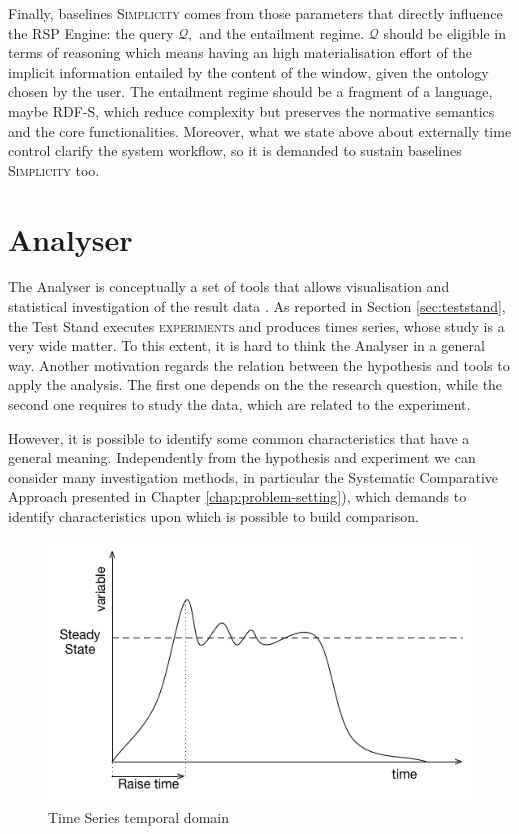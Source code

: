 Finally, baselines \textsc{Simplicity} comes from those parameters that directly influence the RSP Engine: the query $\mathcal{Q},$ and the entailment regime. $\mathcal{Q}$ should be eligible in terms of reasoning which means having an high materialisation effort of the implicit information entailed by the content of the window, given the ontology chosen by the user. The entailment regime should be a fragment of a language, maybe RDF-S,  which reduce complexity but preserves the normative semantics and the core functionalities. Moreover, what we state above about externally time control clarify the system workflow, so it is demanded to sustain baselines \textsc{Simplicity} too.

\section{Analyser}\label{sec:analyser}

The Analyser is conceptually a set of tools that allows visualisation and statistical investigation of the result data . As reported in Section \ref{sec:teststand}, the Test Stand executes \textsc{experiments} and produces times series, whose study is a very wide matter. To this extent, it is hard to think the Analyser in a general way. Another motivation regards the relation between the hypothesis and    tools to apply the analysis. The first one depends on the the research question, while the second one requires to study the data, which are related to the experiment. 

However, it is possible to identify some common characteristics that have a general meaning. Independently from the hypothesis and  experiment we can consider many investigation methods, in particular the Systematic Comparative Approach presented in Chapter \ref{chap:problem-setting}), which demands to identify characteristics upon which is possible to build comparison. 

\begin{figure}[tbh]
  \centering
	\includegraphics[width=0.5\linewidth]{images/steady-state}
	\caption{Time Series temporal domain} 	
  	\label{fig:steady-state}
\end{figure}

